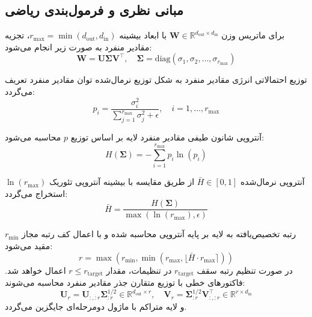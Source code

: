 \subsection{مبانی نظری و فرمول‌بندی ریاضی}
برای ماتریس وزن $\mathbf{W} \in \mathbb{R}^{d_{\text{out}} \times d_{\text{in}}}$ با ابعاد بیشینه $r_{\text{max}} = \min(d_{\text{out}}, d_{\text{in}})$، تجزیه مقادیر منفرد به صورت زیر انجام می‌شود:
\begin{equation}
\mathbf{W} = \mathbf{U} \mathbf{\Sigma} \mathbf{V}^\top, \quad \mathbf{\Sigma} = \text{diag}(\sigma_1, \sigma_2, \dots, \sigma_{r_{\text{max}}})
\end{equation}

توزیع احتمالاتی انرژی مقادیر منفرد به شکل توزیع نرمال‌شده توان مقادیر منفرد تعریف می‌گردد:
\begin{equation}
p_i = \frac{\sigma_i^2}{\sum_{j=1}^{r_{\text{max}}} \sigma_j^2 + \epsilon}, \quad i = 1, \dots, r_{\text{max}}
\end{equation}

آنتروپی شانون طیفی مقادیر منفرد لایه بر اساس توزیع $p$ محاسبه می‌شود:
\begin{equation}
H(\mathbf{\Sigma}) = - \sum_{i=1}^{r_{\text{max}}} p_i \ln(p_i)
\end{equation}

آنتروپی نرمال‌شده $\bar{H} \in [0, 1]$ از طریق مقایسه با بیشینه آنتروپی تئوریک $\ln(r_{\text{max}})$ استخراج می‌گردد:
\begin{equation}
\bar{H} = \frac{H(\mathbf{\Sigma})}{\max(\ln(r_{\text{max}}), \epsilon)}
\end{equation}

رتبه تخصیص‌یافته به لایه بر پایه آنتروپی محاسبه شده و با اعمال کف رتبه مجاز $r_{\text{min}}$ مقید می‌شود:
\begin{equation}
r = \max\left(r_{\text{min}}, \min\left(r_{\text{max}}, \lfloor \bar{H} \cdot r_{\text{max}} \rceil\right)\right)
\end{equation}
در صورت تنظیم رتبه سقف $r_{\text{target}}$ در تنظیمات، مقدار $r \le r_{\text{target}}$ اعمال خواهد شد. فاکتورهای خطی با توزیع متقارن جذر مقادیر منفرد محاسبه می‌شوند:
\begin{equation}
\mathbf{U}_r = \mathbf{U}_{:, :r} \mathbf{\Sigma}_{:r}^{1/2} \in \mathbb{R}^{d_{\text{out}} \times r}, \quad \mathbf{V}_r = \mathbf{\Sigma}_{:r}^{1/2} \mathbf{V}_{:, :r}^\top \in \mathbb{R}^{r \times d_{\text{in}}}
\end{equation}
و لایه متراکم با ماژول دو‌مرحله‌ای  جایگزین می‌گردد.

